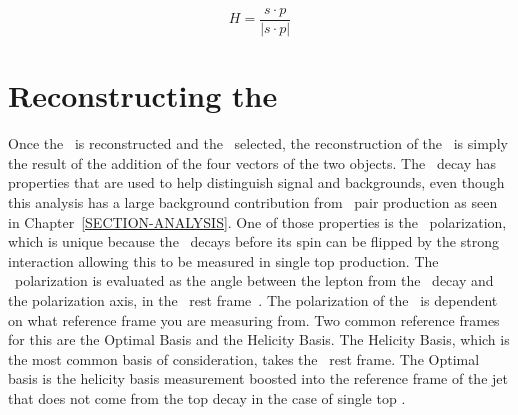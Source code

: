 \begin{equation}
\label{EQ-hel}
H = \frac{s \cdot p }{|s \cdot p|}
\end{equation}



\section{Reconstructing the \at}
\label{SECTION-OBJ-TOP}

Once the \aw~is reconstructed and the \bjet~selected, the reconstruction of the \at~is simply the result of the addition of the four vectors of the two objects. The \at~decay has properties that are used to help distinguish signal and backgrounds, even though this analysis has a large background contribution from \athyph~pair production as seen in Chapter~\ref{SECTION-ANALYSIS}. One of those properties is the \athyph~polarization, which is unique because the \at~decays before its spin can be flipped by the strong interaction allowing this to be measured in single top production. The \athyph~polarization is evaluated as the angle between the lepton from the \at~decay and the polarization axis, in the \at~rest frame~\cite{Schwienhorst:2010je}. The polarization of the \at~is dependent on what reference frame you are measuring from. Two common reference frames for this are the Optimal Basis and the Helicity Basis. The Helicity Basis, which is the most common basis of consideration, takes the \at~rest frame. The Optimal basis is the helicity basis measurement boosted into the reference frame of the jet that does not come from the top decay in the case of single top \tchan. 
